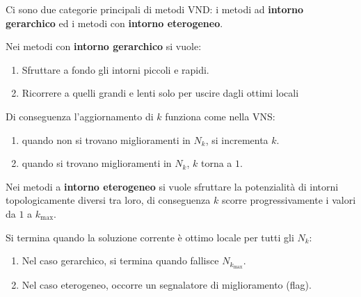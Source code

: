 \documentclass[\main/main.tex]{subfiles}
\begin{document}
\begin{multicols}{2}
\begin{observation}
    Ci sono due categorie principali di metodi VND: i metodi ad \textbf{intorno gerarchico} ed i metodi con \textbf{intorno eterogeneo}. 
\end{observation}
\begin{definition}
    Nei metodi con \textbf{intorno gerarchico} si vuole:
    \begin{enumerate}
        \item Sfruttare a fondo gli intorni piccoli e rapidi.
        \item Ricorrere a quelli grandi e lenti solo per uscire dagli ottimi locali
    \end{enumerate}
    Di conseguenza l'aggiornamento di \(k\) funziona come nella VNS:
    \begin{enumerate}
        \item quando non si trovano miglioramenti in \(N_k\), si incrementa \(k\).
        \item quando si trovano miglioramenti in \(N_k\), \(k\) torna a \(1\).
    \end{enumerate}
\end{definition}
\begin{definition}
    Nei metodi a \textbf{intorno eterogeneo} si vuole sfruttare la potenzialità di intorni topologicamente diversi tra loro, di conseguenza \(k\) scorre progressivamente i valori da \(1\) a \(k_{\max}\).
\end{definition}
\begin{observation}
    Si termina quando la soluzione corrente è ottimo locale per tutti gli \(N_k\):
    \begin{enumerate}
        \item Nel caso gerarchico, si termina quando fallisce \(N_{k_{\max}}\).
        \item Nel caso eterogeneo, occorre un segnalatore di miglioramento (flag).
    \end{enumerate}
\end{observation}
\end{multicols}

\clearpage
\end{document}
